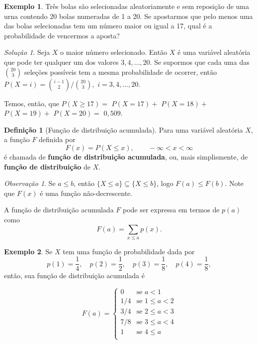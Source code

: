 \documentclass[]{book}
\theoremstyle{definition}
\newtheorem{definition}{Definição}[chapter]
\theoremstyle{definition}
\newtheorem{example}{Exemplo}[chapter]
\theoremstyle{definition}
\theoremstyle{remark}
\newtheorem*{remark}{Observação}
\newtheorem*{solution}{Solução}
\begin{document}
\begin{example}
\protect\hypertarget{exm:unnamed-chunk-166}{}{\label{exm:unnamed-chunk-166} }Três bolas são selecionadas aleatoriamente e sem reposição de uma urna contendo 20 bolas numeradas de 1 a 20.
Se apostarmos que pelo menos uma das bolas selecionadas tem um número maior ou igual a 17, qual é a probabilidade de vencermos a aposta?
\end{example}

\begin{solution}
\iffalse{} {Solução. } \fi{}Seja \(X\) o maior número selecionado.
Então \(X\) é uma variável aleatória que pode ter qualquer um dos valores \(3, 4, \ldots, 20\).
Se supormos que cada uma das \({20\choose 3}\) seleções possíveis tem a mesma probabilidade de ocorrer, então
\(P(X=i) = {{i-1} \choose 2}/{20\choose 3},\) \(i = 3, 4, \ldots, 20.\)

Temos, então, que
\(P(X \geq 17)=\) \(P(X=17) +\) \(P(X=18) +\) \(P(X=19) +\) \(P(X=20) =\) \(0{,}509.\)
\end{solution}

\begin{definition}[Função de distribuição acumulada]
\protect\hypertarget{def:defFDA}{}{\label{def:defFDA} \iffalse (Função de distribuição acumulada) \fi{} }Para uma variável aleatória \(X\), a função \(F\) definida por
\[F(x) = P(X\leq x), \qquad -\infty<x<\infty\]
é chamada de \textbf{função de distribuição acumulada}, ou, mais simplismente, de \textbf{função de distribuição} de \(X\).
\end{definition}

\begin{remark}
\iffalse{} {Observação. } \fi{}Se \(a \leq b\), então \(\{X\leq a\} \subseteq \{X \leq b\}\), logo \(F(a)\leq F(b)\).
Note que \(F(x)\) é uma função não-decrescente.
\end{remark}

A função de distribuição acumulada \(F\) pode ser expressa em termos de \(p(a)\) como
\[F(a) = \sum_{x \leq a}p(x).\]

\begin{example}
\protect\hypertarget{exm:unnamed-chunk-168}{}{\label{exm:unnamed-chunk-168} }Se \(X\) tem uma função de probabilidade dada por
\[p(1) = \frac{1}{4}, \quad p(2) = \frac{1}{2}, \quad p(3) = \frac{1}{8}, \quad p(4) = \frac{1}{8},\]
então, sua função de distribuição acumulada é

\begin{equation*}
  F(a) =
    \begin{cases}
      0 & \text{se } a < 1\\
      1/4 & \text{se } 1 \leq a < 2\\
      3/4 & \text{se } 2 \leq a < 3\\
      7/8 & \text{se } 3 \leq a < 4\\
      1 & \text{se } 4 \leq a\\
    \end{cases}       
\end{equation*}
\end{example}
\end{document}
